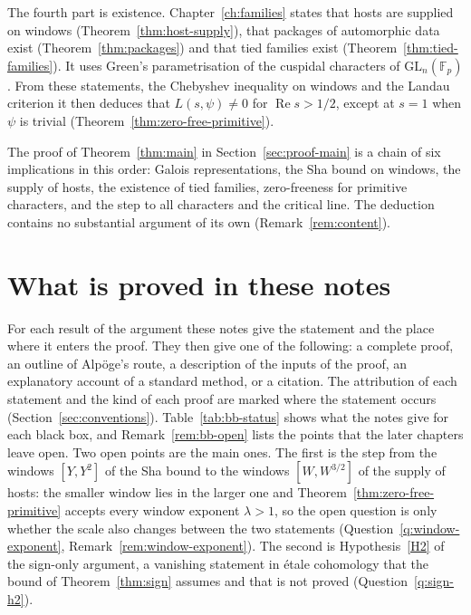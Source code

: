 \documentclass[11pt]{amsbook}
\theoremstyle{plain}
\theoremstyle{definition}
\theoremstyle{remark}
\numberwithin{equation}{section}
\numberwithin{figure}{chapter}
\numberwithin{table}{chapter}
\newcommand{\F}{\mathbb{F}}
\begin{document}
The fourth part is existence. Chapter~\ref{ch:families} states
that hosts are supplied on windows
(Theorem~\ref{thm:host-supply}), that packages
of automorphic data exist (Theorem~\ref{thm:packages}) and that
tied families exist (Theorem~\ref{thm:tied-families}). It uses
Green's parametrisation of the cuspidal characters of
$\mathrm{GL}_n(\F_p)$ \cite{Green1955}. From these statements, the
Chebyshev inequality on windows and the Landau criterion it then
deduces that $L(s,\psi)\ne0$ for $\operatorname{Re}s>1/2$, except
at $s=1$ when $\psi$ is trivial
(Theorem~\ref{thm:zero-free-primitive}).

The proof of Theorem~\ref{thm:main} in
Section~\ref{sec:proof-main} is a chain of six implications in
this order: Galois representations, the Sha bound on windows, the
supply of hosts, the existence of tied families, zero-freeness for
primitive characters, and the step to all characters and the
critical line. The deduction contains no substantial argument of
its own (Remark~\ref{rem:content}).
{\renewcommand{\thefigure}{I.\arabic{figure}}%
\begin{figure}[tbp]
\centering

\end{figure}}

\section*{What is proved in these notes}

For each result of the argument these notes give the statement
and the place where it enters the proof. They then give one of the
following: a complete proof, an outline of Alp\"oge's route, a
description of the inputs of the proof, an explanatory account of a
standard method, or a citation. The attribution of each
statement and the kind of each proof are marked where the statement
occurs (Section~\ref{sec:conventions}). Table~\ref{tab:bb-status}
shows what the notes give for each black box, and
Remark~\ref{rem:bb-open} lists the points that the later chapters
leave open. Two open points are the main ones. The first is the
step from the windows $[Y,Y^2]$ of the Sha bound to the windows
$[W,W^{3/2}]$ of the supply of hosts: the smaller window lies in
the larger one and Theorem~\ref{thm:zero-free-primitive} accepts
every window exponent $\lambda>1$, so the open question is only
whether the scale also changes between the two statements
(Question~\ref{q:window-exponent},
Remark~\ref{rem:window-exponent}). The second is
Hypothesis~\ref{H2} of the sign-only argument, a vanishing
statement in \'etale cohomology that the bound of
Theorem~\ref{thm:sign} assumes and that is not proved
(Question~\ref{q:sign-h2}).
\end{document}
